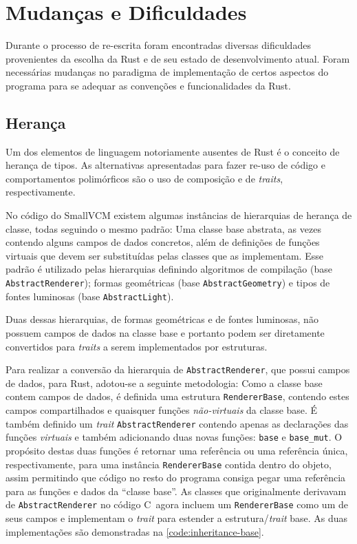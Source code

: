 \documentclass[tg]{mdtufsm}
\def\Cpp{{C\nolinebreak[4]\raisebox{.20ex}{\small\bf++}}}
\newcommand{\todo}[1]{}
\begin{document}
\todo{Overview do código necessário para o objetivo.}

\section{Mudanças e Dificuldades}

Durante o processo de re-escrita foram encontradas diversas dificuldades provenientes da escolha da Rust e de seu estado de desenvolvimento atual. Foram necessárias mudanças no paradigma de implementação de certos aspectos do programa para se adequar as convenções e funcionalidades da Rust.

\subsection{Herança}

Um dos elementos de linguagem notoriamente ausentes de Rust é o conceito de herança de tipos. As alternativas apresentadas para fazer re-uso de código e comportamentos polimórficos são o uso de composição e de \emph{traits}, respectivamente.

No código do SmallVCM existem algumas instâncias de hierarquias de herança de classe, todas seguindo o mesmo padrão: Uma classe base abstrata, as vezes contendo alguns campos de dados concretos, além de definições de funções virtuais que devem ser substituídas pelas classes que as implementam. Esse padrão é utilizado pelas hierarquias definindo algoritmos de compilação (base \texttt{AbstractRenderer}); formas geométricas (base \texttt{AbstractGeometry}) e tipos de fontes luminosas (base \texttt{AbstractLight}).

Duas dessas hierarquias, de formas geométricas e de fontes luminosas, não possuem campos de dados na classe base e portanto podem ser diretamente convertidos para \emph{traits} a serem implementados por estruturas.

Para realizar a conversão da hierarquia de \texttt{AbstractRenderer}, que possui campos de dados, para Rust, adotou-se a seguinte metodologia: Como a classe base contem campos de dados, é definida uma estrutura \texttt{RendererBase}, contendo estes campos compartilhados e quaisquer funções \emph{não-virtuais} da classe base. É também definido um \emph{trait} \texttt{AbstractRenderer} contendo apenas as declarações das funções \emph{virtuais} e também adicionando duas novas funções: \texttt{base} e \texttt{base\_mut}. O propósito destas duas funções é retornar uma referência ou uma referência única, respectivamente, para uma instância \texttt{RendererBase} contida dentro do objeto, assim permitindo que código no resto do programa consiga pegar uma referência para as funções e dados da ``classe base''. As classes que originalmente derivavam de \texttt{AbstractRenderer} no código \Cpp\ agora incluem um \texttt{RendererBase} como um de seus campos e implementam o \emph{trait} para estender a estrutura/\emph{trait} base. As duas implementações são demonstradas na \autoref{code:inheritance-base}.
\end{document}
